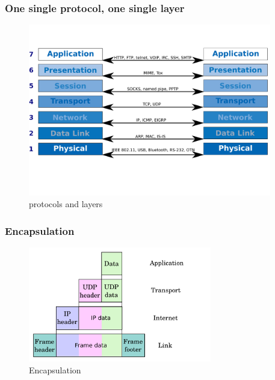   \begin{frame}
    \frametitle{One single protocol, one single layer}
    \begin{figure}[t]
      \centering
      \includegraphics[height=7.5cm]{./imgs/layer2protocol.pdf}
      \caption{protocols and layers}
      \label{fig:layers2proto}
    \end{figure}
  \end{frame}
  \begin{frame}
    \frametitle{Encapsulation}
    \begin{figure}[t]
      \centering
      \includegraphics[height=5cm]{./imgs/encapsulation.pdf}
      \caption{Encapsulation}
      \label{fig:encapsulation}
    \end{figure}
  \end{frame}